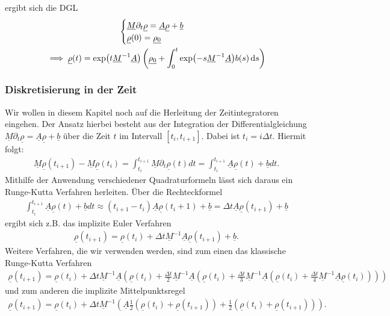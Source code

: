 ergibt sich die DGL
\begin{gather*}
\begin{cases}
\underline{M} \partial_t \underline{\rho} = \underline{A} \underline{\rho} + \underline{b} \\
\underline{\rho}(0) = \underline{\rho_0}
\end{cases}\\
\implies \underline{\rho}(t) = \exp(t \underline{M}^{-1} \underline{A}) \left( \underline{\rho_0} + \int_{0}^{t} \exp(-s\underline{M}^{-1} \underline{A}) b(s) \mathop{}\!\mathrm{d} s \right) 
\end{gather*}

\subsubsection{Diskretisierung in der Zeit}

Wir wollen in diesem Kapitel noch auf die Herleitung der Zeitintegratoren eingehen. Der Ansatz hierbei besteht aus der 
Integration der Differentialgleichung $\underline{M} \partial_t \underline{\rho} = \underline{A} \underline{\rho} + \underline{b}$ über die Zeit $t$ im Intervall $[t_i, t_{i+1}]$.
Dabei ist $t_i = i \Delta t$. Hiermit folgt:
\begin{align*}
  \underline{M}\underline{\rho}(t_{i+1}) - \underline{M}\underline{\rho}(t_i) = \int_{t_i}^{t_{i+1}}
  \underline{M} \partial_t \underline{\rho}(t) dt =\int_{t_i}^{t_{i+1}} \underline{A} \underline{\rho}(t) + \underline{b} dt.
\end{align*}
Mithilfe der Anwendung verschiedener Quadraturformeln lässt sich daraus ein Runge-Kutta Verfahren herleiten. Über die Rechteckformel 
\begin{align*}
  \int_{t_i}^{t_{i+1}}\underline{A} \underline{\rho}(t) + \underline{b} dt \approx (t_{i+1}-t_i) 
  \underline{A} \underline{\rho}(t_i+1) + \underline{b} = \Delta t \underline{A} \underline{\rho}(t_{i+1}) + \underline{b}
\end{align*}
ergibt sich z.B. das implizite Euler Verfahren
\begin{align*}
  \underline{\rho}(t_{i+1}) = \underline{\rho}(t_{i}) + \Delta t \underline{M}^{-1}\underline{A} \underline{\rho}(t_{i+1}) + \underline{b}.
\end{align*}
Weitere Verfahren, die wir verwenden werden, sind zum einen das
klassische Runge-Kutta Verfahren
\begin{align*}
  \underline{\rho}(t_{i+1}) = \underline{\rho}(t_{i}) +
  \Delta t \underline{M}^{-1}\underline{A} (
  \underline{\rho}(t_{i}) +
  \frac{\Delta t}{2} \underline{M}^{-1}\underline{A} (
  \underline{\rho}(t_{i}) +
  \frac{\Delta t}{3} \underline{M}^{-1}\underline{A} (
  \underline{\rho}(t_{i}) +
  \frac{\Delta t}{4} \underline{M}^{-1}\underline{A} 
  \underline{\rho}(t_{i}) )))
\end{align*}
und zum anderen die implizite Mittelpunktsregel 
\begin{align*}
  \underline{\rho}(t_{i+1}) = \underline{\rho}(t_{i}) +
  \Delta t \underline{M}^{-1} (
  \underline{A} 
  \frac{1}{2}(\underline{\rho}(t_{i}) +
  \underline{\rho}(t_{i+1}) )
  +
  \frac{1}{2} ( \underline{\rho}(t_{i}) +
  \underline{\rho}(t_{i+1}) )).
\end{align*}

